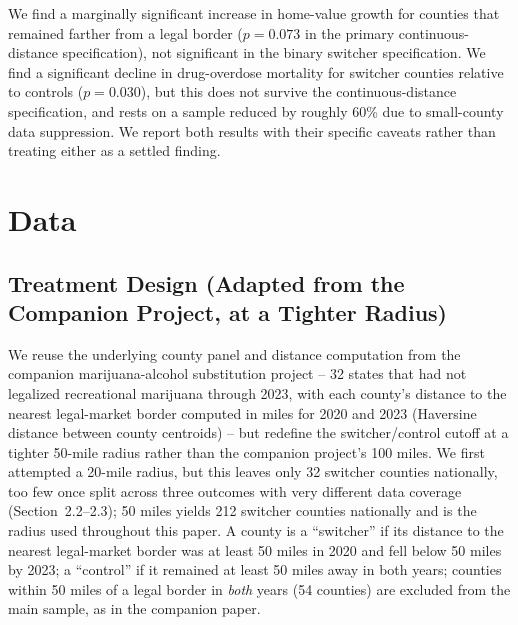 \documentclass[11pt]{article}
\begin{document}
We find a marginally significant increase in home-value growth for
counties that remained farther from a legal border ($p=0.073$ in the
primary continuous-distance specification), not significant in the
binary switcher specification. We find a significant decline in
drug-overdose mortality for switcher counties relative to controls
($p=0.030$), but this does not survive the continuous-distance
specification, and rests on a sample reduced by roughly 60\% due to
small-county data suppression. We report both results with their
specific caveats rather than treating either as a settled finding.

\section{Data}

\subsection{Treatment Design (Adapted from the Companion Project, at a Tighter Radius)}

We reuse the underlying county panel and distance computation from the
companion marijuana-alcohol substitution project -- 32 states that had
not legalized recreational marijuana through 2023, with each county's
distance to the nearest legal-market border computed in miles for 2020
and 2023 (Haversine distance between county centroids) -- but redefine
the switcher/control cutoff at a tighter 50-mile radius rather than the
companion project's 100 miles. We first attempted a 20-mile radius, but
this leaves only 32 switcher counties nationally, too few once split
across three outcomes with very different data coverage (Section~2.2--2.3);
50 miles yields 212 switcher counties nationally and is the radius used
throughout this paper. A county is a ``switcher'' if its distance to
the nearest legal-market border was at least 50 miles in 2020 and fell
below 50 miles by 2023; a ``control'' if it remained at least 50 miles
away in both years; counties within 50 miles of a legal border in
\emph{both} years (54 counties) are excluded from the main sample, as
in the companion paper.
\end{document}

